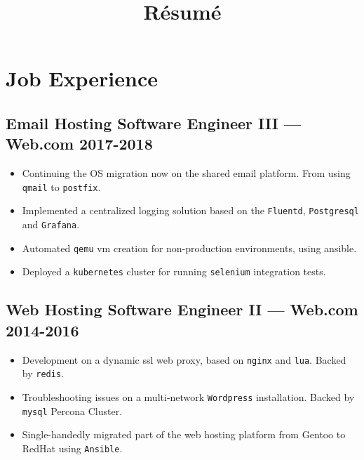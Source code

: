 \documentclass[11pt]{article}
\begin{document}
\title{R\'esum\'e}
\author{\FULLNAME}



\section{Job Experience}


\subsection{Email Hosting Software Engineer III --- Web.com \hfill 2017-2018}
\begin{itemize}
\item Continuing the OS migration now on the shared email platform. From using \texttt{qmail} to \texttt{postfix}.
\item Implemented a centralized logging solution based on the \texttt{Fluentd}, \texttt{Postgresql} and \texttt{Grafana}.
\item Automated \texttt{qemu} vm creation for non-production environments, using ansible.
\item Deployed a \texttt{kubernetes} cluster for running \texttt{selenium} integration tests.
\end{itemize}

\subsection{Web Hosting Software Engineer II --- Web.com \hfill 2014-2016}
\begin{itemize}
\item Development on a dynamic ssl web proxy, based on \texttt{nginx} and \texttt{lua}. Backed by \texttt{redis}.
\item Troubleshooting issues on a multi-network \texttt{Wordpress} installation. Backed by \texttt{mysql} Percona Cluster.
\item Single-handedly migrated part of the web hosting platform from Gentoo to RedHat using \texttt{Ansible}.
\end{itemize}
\end{document}
